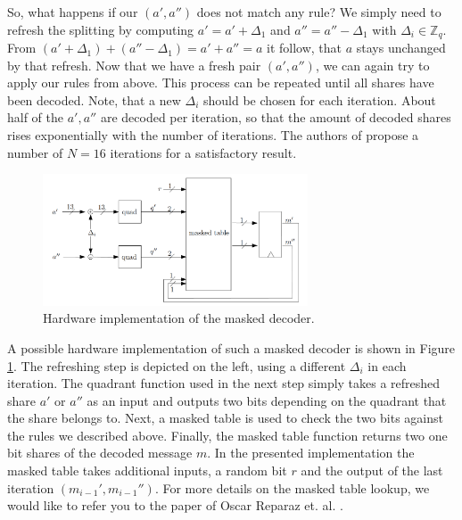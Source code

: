 So, what happens if our \((a', a'')\) does not match any rule? We simply need to refresh the splitting by computing \(a' = a' + \Delta_1\) and \(a'' = a'' - \Delta_1\) with \(\Delta_i \in \mathbb{Z}_q\). From \((a' + \Delta_1) + (a'' - \Delta_1) = a' + a'' = a\) it follow, that \(a\) stays unchanged by that refresh. Now that we have a fresh pair \((a',a'')\), we can again try to apply our rules from above. This process can be repeated until all shares have been decoded. Note, that a new \(\Delta_i\) should be chosen for each iteration. About half of the \(a',a''\) are decoded per iteration, so that the amount of decoded shares rises exponentially with the number of iterations. The authors of \cite{maskedRing} propose a number of \(N = 16\) iterations for a satisfactory result.
\begin{figure}[H]
	\centering
	\includegraphics[width=0.7\textwidth]{maskedDecoder_2.png}
	\caption{Hardware implementation of the masked decoder. \cite{maskedRing}}
	\label{maskedDecoder_2}
\end{figure}
A possible hardware implementation of such a masked decoder is shown in Figure \ref{maskedDecoder_2}. The refreshing step is depicted on the left, using a different \(\Delta_i\) in each iteration. The quadrant function used in the next step simply takes a refreshed share \(a'\) or \(a''\) as an input and outputs two bits depending on the quadrant that the share belongs to. Next, a masked table is used to check the two bits against the rules we described above. Finally, the masked table function returns two one bit shares of the decoded message \(\textit{m}\). In the presented implementation the masked table takes additional inputs, a random bit \(r\) and the output of the last iteration \((m_{i-1}',m_{i-1}'')\). For more details on the masked table lookup, we would like to refer you to the paper of Oscar Reparaz et. al. \cite{maskedRing}.


